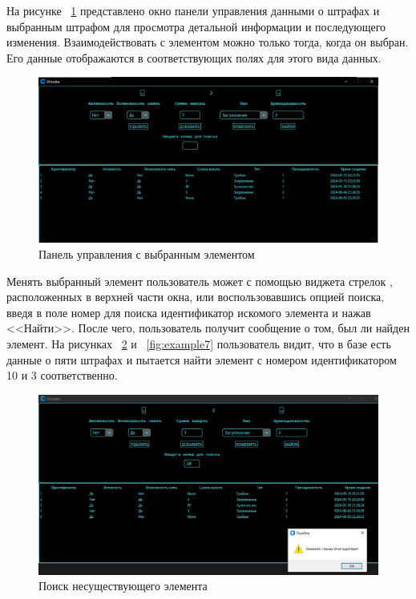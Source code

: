 На рисунке ~\ref{fig:example5} представлено окно панели управления данными о штрафах и выбранным штрафом для просмотра детальной информации и последующего изменения. 
Взаимодействовать с элементом можно только тогда, когда он выбран. Его данные отображаются в соответствующих полях для этого вида данных. 
\begin{figure}[H]
	\centering
	\includegraphics[width=1.0\linewidth]{images/Example5}
	\caption{Панель управления с выбранным элементом}
	\label{fig:example5}
\end{figure}

Менять выбранный элемент пользователь может с помощью виджета \textquotedbl стрелок \textquotedbl, расположенных в верхней части окна, или воспользовавшись опцией поиска, введя в поле \textquotedbl номер для поиска \textquotedbl идентификатор искомого элемента и нажав <<Найти>>. После чего, пользователь получит сообщение о том, был ли найден элемент.
На рисунках  ~\ref{fig:example6} и ~\ref{fig:example7} пользователь видит, что в базе есть данные о пяти штрафах и пытается найти элемент с номером идентификатором 10 и 3 соответственно.
\begin{figure}[H]
	\centering
	\includegraphics[width=1.0\linewidth]{images/Example6}
	\caption{Поиск несуществующего элемента}
	\label{fig:example6}
\end{figure}

